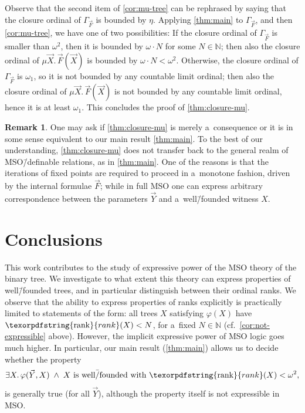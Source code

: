 \documentclass[11pt,a4paper]{amsart}
\theoremstyle{plain}
\theoremstyle{definition}
\newtheorem{rem}[thm]{Remark}
\theoremstyle{defC}
\theoremstyle{thmC}
\theoremstyle{plain}
\numberwithin{equation}{section}
\numberwithin{equation}{section}
\numberwithin{figure}{section}
\newcommand{\ident}[1]{\ensuremath{\texorpdfstring{\mathrm{\mathnm{#1}}}{#1}}\xspace}
\newcommand{\domain}[1]{\ensuremath{\mathbb{#1}}\xspace}
\newcommand{\N}{\domain{N}}
\newcommand{\mathnm}[1]{#1}
\newcommand{\rank}{\ident{rank}}
\begin{document}
Observe that the second item of \cref{cor:mu-tree} can be rephrased by saying that the closure ordinal of $\Gamma_{\!\!\vec{F}}$ is bounded by $\eta$.
Applying \cref{thm:main} to $\Gamma_{\!\!\vec{F}}$, and then \cref{cor:mu-tree}, we have one of two possibilities:
If the closure ordinal of $\Gamma_{\!\!\vec{F}}$ is smaller than $\omega^2$, then it is bounded by $\omega\cdot N$ for some $N\in\N$;
then also the closure ordinal of $\mu\vec{X}.\,\vec{F}(\vec{X})$ is bounded by $\omega\cdot N<\omega^2$.
Otherwise, the closure ordinal of $\Gamma_{\!\!\vec{F}}$ is $\omega_1$, so it is not bounded by any countable limit ordinal;
then also the closure ordinal of $\mu\vec{X}.\,\vec{F}(\vec{X})$ is not bounded by any countable limit ordinal, hence it is at least $\omega_1$.
This concludes the proof of \cref{thm:closure-mu}.

\begin{rem}
	One may ask if \cref{thm:closure-mu} is merely a~consequence or it is in some sense equivalent to our main result \cref{thm:main}.
	To the best of our understanding, \cref{thm:closure-mu} does not transfer back to the general realm of MSO\=/definable relations, as in \cref{thm:main}.
	One of the reasons is that the iterations of fixed points are required to proceed in a~monotone fashion, driven by the internal formulae $\vec{F}$;
	while in full MSO one can express arbitrary correspondence between the parameters $\vec{Y}$ and a~well\=/founded witness $X$.
\end{rem}



\section{Conclusions}
\label{sec:conclusions}

This work contributes to the study of expressive power of the MSO theory of the binary tree.
We investigate to what extent this theory can express properties of well\=/founded trees, and in particular distinguish between their ordinal ranks.
We observe that the ability to express properties of ranks explicitly is practically limited to statements of the form:
all trees $X$ satisfying $\varphi (X)$ have $\rank (X) < N$, for a~fixed $N \in \N$ (cf.\ \cref{cor:not-expressible} above).
However, the implicit expressive power of MSO logic goes much higher.
In particular, our main result (\cref{thm:main}) allows us to decide whether the property
\[
  \exists X. \, \varphi (\vec{Y}, X) \; \wedge \;
  X \mbox{ is well\=/founded with } \rank (X) < \omega^2,
\]
is generally true (for all $\vec{Y}$), although the property itself is not expressible in MSO.
\end{document}
